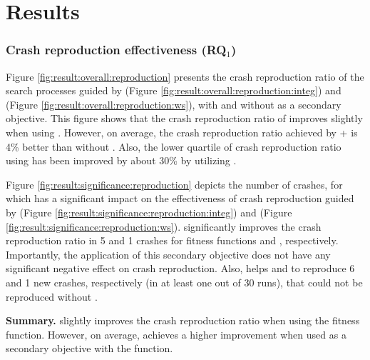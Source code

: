 \section{Results}
\label{sec:bbc:results}

\subsubsection{Crash reproduction effectiveness (RQ$_1$)}

Figure \ref{fig:result:overall:reproduction} presents the crash reproduction ratio of the search processes guided by \integ  (Figure \ref{fig:result:overall:reproduction:integ}) and \WS (Figure \ref{fig:result:overall:reproduction:ws}), with and without \bbc as a secondary objective. This figure shows that the crash reproduction ratio of \WS improves slightly when using \bbc. However, on average, the crash reproduction ratio achieved by \integ + \bbc is 4\% better than \integ without \bbc. Also, the lower quartile of crash reproduction ratio using \integ has been improved by about 30\% by utilizing \bbc.

Figure \ref{fig:result:significance:reproduction} depicts the number of crashes, for which \bbc has a significant impact on the effectiveness of crash reproduction guided by \integ (Figure \ref{fig:result:significance:reproduction:integ}) and \WS (Figure \ref{fig:result:significance:reproduction:ws}). 
\bbc significantly improves the crash reproduction ratio in 5 and 1 crashes for fitness functions \integ and \WS, respectively. Importantly, the application of this secondary objective does not have any significant negative effect on crash reproduction. Also, \bbc helps \integ and \WS to reproduce 6 and 1 new crashes, respectively (in at least one out of 30 runs), that could not be reproduced without \bbc.

\textbf{Summary. } \bbc slightly improves the crash reproduction ratio when using the \WS fitness function. However, on average, \bbc achieves a higher improvement when used as a secondary objective with the \integ function.

